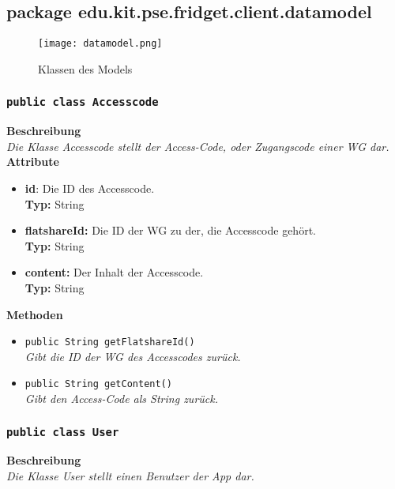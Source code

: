 \subsection{package edu.kit.pse.fridget.client.datamodel}
\begin{figure}[H]
	       \centering
	       \texttt{[image: datamodel.png]}
	       \caption{Klassen des Models}
	      \end{figure}
\subsubsection{\texttt{public class Accesscode}}

	\textbf{Beschreibung} \\
	\textit{Die Klasse Accesscode stellt der Access-Code, oder Zugangscode einer WG dar.} \\
	
	\textbf{Attribute}
	\begin{itemize}
		\item \textbf{id}: Die ID des Accesscode. \\
		\textbf{Typ:} String
		
		\item \textbf{flatshareId:} Die ID der WG zu der, die Accesscode gehört. \\
		\textbf{Typ:} String

		\item \textbf{content:} Der Inhalt der Accesscode.\\
		\textbf{Typ:} String
	\end{itemize}

	\textbf{Methoden}
	\begin{itemize}
		\item{\texttt{public String getFlatshareId()}}\\
		\textit{Gibt die ID der WG des Accesscodes zurück.}\\
		\item{\texttt{public String getContent()}}\\
		\textit{Gibt den Access-Code als String zurück.}\\
	\end{itemize}

	

\subsubsection{\texttt{public class User}}

	\textbf{Beschreibung} \\
	\textit{Die Klasse User stellt einen Benutzer der App dar.}\\
	
